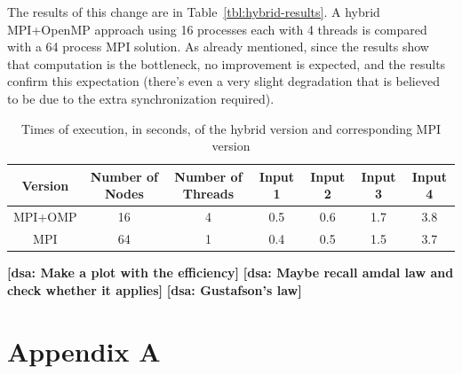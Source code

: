 \documentclass{article}
\newcommand{\dsanote}[1]{\textbf{[dsa: #1]}}
\begin{document}
The results of this change are in Table~\ref{tbl:hybrid-results}. A hybrid MPI+OpenMP
approach using 16 processes each with 4 threads is compared with a 64 process
MPI solution. As already mentioned, since the results show that computation
is the bottleneck, no improvement is expected, and the results confirm this expectation
(there's even a very slight degradation that is believed to be due to the extra
synchronization required).

\begin{table}[h!]
	\centering
	\begin{tabular}{||c c c c c c c||} 
	 \hline
	 Version & Number of Nodes & Number of Threads & Input 1 & Input 2 & Input 3 & Input 4\\ [0.5ex] 
	 \hline\hline
	  MPI+OMP & 16 & 4 & 0.5 & 0.6 & 1.7 & 3.8 \\  [1ex] 
	 \hline
	  MPI & 64 & 1 & 0.4 & 0.5 & 1.5 & 3.7 \\  [1ex] 
	 \hline
	\end{tabular}
	\caption{Times of execution, in seconds, of the hybrid version and corresponding MPI version}
	\label{times-mpi-omp}
\end{table}

\dsanote{Make a plot with the efficiency}
\dsanote{Maybe recall amdal law and check whether it applies}
\dsanote{Gustafson's law}

\newpage

\section{Appendix A}
\end{document}
